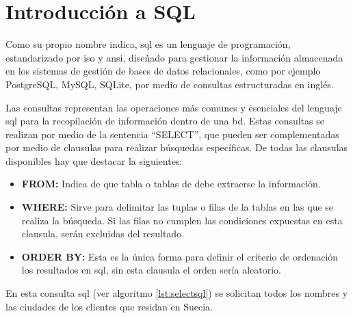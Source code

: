 \section{Introducción a SQL}

Como su propio nombre indica, \acrfull{sql} es un lenguaje de programación, estandarizado por \acrshort{iso}\cite{ISO} y \acrshort{ansi}\cite{ANSI}, diseñado para gestionar la información almacenada en los sistemas de gestión de bases de datos relacionales, como por ejemplo PostgreSQL\cite{PostgreSQL}, MySQL\cite{MySQL}, SQLite\cite{SQLite}, por medio de consultas estructuradas en inglés.

Las consultas representan las operaciones más comunes y esenciales del lenguaje \acrshort{sql} para la recopilación de información dentro de una \acrshort{bd}. Estas consultas se realizan por medio de la sentencia ``SELECT'', que pueden ser complementadas por medio de clausulas para realizar búsquedas específicas. De todas las clausulas disponibles hay que destacar la siguientes:

\begin{itemize}
	\item \textbf{FROM:} Indica de que tabla o tablas de debe extraerse la información.
	\item \textbf{WHERE:} Sirve para delimitar las tuplas o filas de la tablas en las que se realiza la búsqueda. Si las filas no cumplen las condiciones expuestas en esta clausula, serán excluidas del resultado.
	\item \textbf{ORDER BY:} Esta es la única forma para definir el criterio de ordenación los resultados en \acrshort{sql}, sin esta clausula el orden sería aleatorio.
\end{itemize}



En esta consulta \acrshort{sql} (ver algoritmo \ref{lst:selectsql}) se solicitan todos los nombres y las ciudades de los clientes que residan en Suecia.